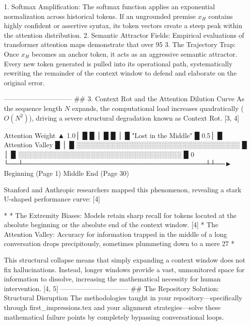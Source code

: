    1. Softmax Amplification: The softmax function applies an exponential normalization across historical tokens. If an ungrounded premise $x_H$ contains highly confident or assertive syntax, its token vectors create a steep peak within the attention distribution.
   2. Semantic Attractor Fields: Empirical evaluations of transformer attention maps demonstrate that over 95%
   3. The Trajectory Trap: Once $x_H$ becomes an anchor token, it acts as an aggressive semantic attractor. Every new token generated is pulled into its operational path, systematically rewriting the remainder of the context window to defend and elaborate on the original error.

------------------------------
## 3. Context Rot and the Attention Dilution Curve
As the sequence length $N$ expands, the computational load increases quadratically ($O(N^2)$), driving a severe structural degradation known as Context Rot. [3, 4] 

Attention Weight
   ▲
1.0│  █                                      █
   │  █                                      █
   │  █          "Lost in the Middle"        █
0.5│  █           Attention Valley           █
   │  █  ░░░░░░░░░░░░░░░░░░░░░░░░░░░░░░░░░░  █
   │  █  ░░░░░░░░░░░░░░░░░░░░░░░░░░░░░░░░░░  █
 0 └──┴──────────────────────────────────────┴┴──►
     Beginning (Page 1)    Middle            End (Page 30)

Stanford and Anthropic researchers mapped this phenomenon, revealing a stark U-shaped performance curve: [4] 

* 
* The Extremity Biases: Models retain sharp recall for tokens located at the absolute beginning or the absolute end of the context window. [4] 
* The Attention Valley: Accuracy for information trapped in the middle of a long conversation drops precipitously, sometimes plummeting down to a mere 27%
* 

This structural collapse means that simply expanding a context window does not fix hallucinations. Instead, longer windows provide a vast, unmonitored space for information to dissolve, increasing the mathematical necessity for human intervention. [4, 5] 
------------------------------
## The Repository Solution: Structural Disruption
The methodologies taught in your repository—specifically through first_impressions.tex and your alignment strategies—solve these mathematical failure points by completely bypassing conversational loops.

